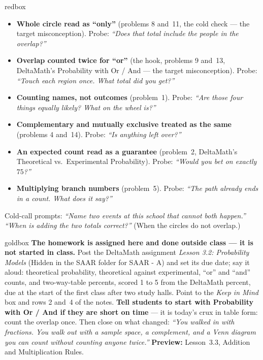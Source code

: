 \documentclass[10pt]{article}
\begin{document}
\boxguard
\begin{skillbox}{redbox}
\begin{itemize}[leftmargin=1.2em, nosep]
  \item \textbf{Whole circle read as ``only''} (problems 8 and~11, the cold check --- the target
        misconception). Probe: \emph{``Does that total include the people in the overlap?''}
  \item \textbf{Overlap counted twice for ``or''} (the hook, problems 9 and~13, DeltaMath's
        Probability with Or / And --- the target misconception). Probe: \emph{``Touch each
        region once. What total did you get?''}
  \item \textbf{Counting names, not outcomes} (problem~1). Probe: \emph{``Are those four things
        equally likely? What on the wheel is?''}
  \item \textbf{Complementary and mutually exclusive treated as the same} (problems 4
        and~14). Probe: \emph{``Is anything left over?''}
  \item \textbf{An expected count read as a guarantee} (problem~2, DeltaMath's Theoretical vs.\
        Experimental Probability). Probe: \emph{``Would you bet on exactly $75$?''}
  \item \textbf{Multiplying branch numbers} (problem~5). Probe: \emph{``The path already ends in
        a count. What does it say?''}
\end{itemize}
Cold-call prompts: \emph{``Name two events at this school that cannot both happen.''} \quad
\emph{``When \emph{is} adding the two totals correct?''} (When the circles do not overlap.)
\end{skillbox}

\boxguard
\begin{skillbox}{goldbox}
\textbf{The homework is assigned here and done outside class --- it is not started in class.}
Post the DeltaMath assignment \emph{Lesson 3.2: Probability Models} (Hidden in the SAAR folder
for SAAR - A) and set its due date; say it aloud: theoretical probability, theoretical against
experimental, ``or'' and ``and'' counts, and two-way-table percents, scored 1 to 5 from the
DeltaMath percent, due at the start of the first class after two study halls. Point to the
\emph{Keep in Mind} box and rows 2 and~4 of the notes. \textbf{Tell students to start with
Probability with Or / And if they are short on time} --- it is today's crux in table form: count
the overlap once. Then close on what changed: \emph{``You walked in with fractions. You walk out
with a sample space, a complement, and a Venn diagram you can count without counting anyone
twice.''} \textbf{Preview:} Lesson~3.3, Addition and Multiplication Rules.
\end{skillbox}
\end{document}
